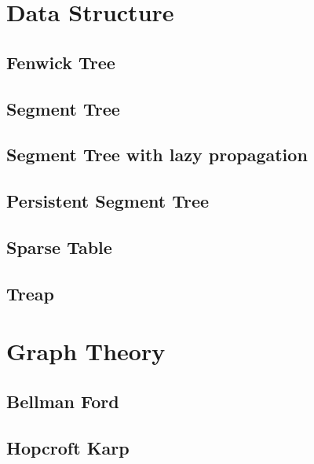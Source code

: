 \section{Data Structure}
\subsection{Fenwick Tree}
\raggedbottom
\subsection{Segment Tree}
\raggedbottom
\subsection{Segment Tree with lazy propagation}
\raggedbottom
\subsection{Persistent Segment Tree}
\raggedbottom
\subsection{Sparse Table}
\raggedbottom
\subsection{Treap}
\raggedbottom
\subsection{}
\raggedbottom

\hrulefill

\section{Graph Theory}
\subsection{Bellman Ford}
\raggedbottom
\subsection{Hopcroft Karp}
\raggedbottom
